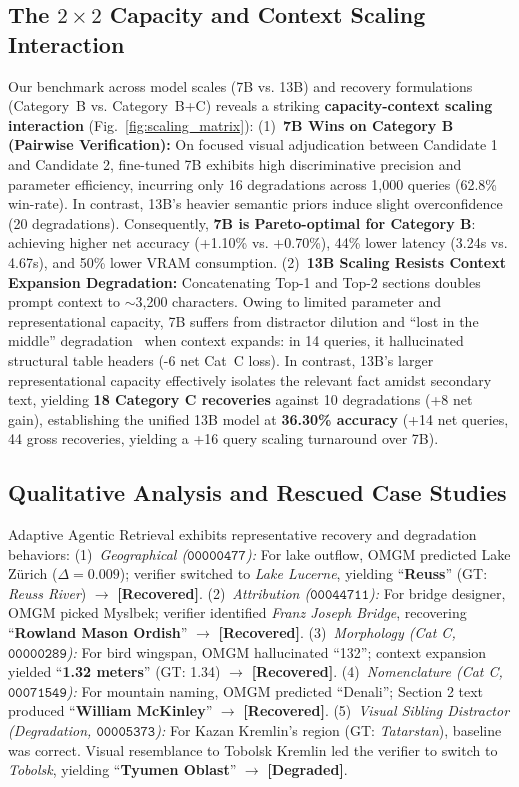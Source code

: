 \documentclass[conference]{IEEEtran}
\begin{document}
\subsection{The \texorpdfstring{$2 \times 2$}{2x2} Capacity and Context Scaling Interaction}
Our benchmark across model scales (7B vs. 13B) and recovery formulations (Category~B vs. Category~B+C) reveals a striking \textbf{capacity-context scaling interaction} (Fig.~\ref{fig:scaling_matrix}):
(1)~\textbf{7B Wins on Category B (Pairwise Verification):} On focused visual adjudication between Candidate 1 and Candidate 2, fine-tuned 7B exhibits high discriminative precision and parameter efficiency, incurring only 16 degradations across 1,000 queries (62.8\% win-rate). In contrast, 13B's heavier semantic priors induce slight overconfidence (20 degradations). Consequently, \textbf{7B is Pareto-optimal for Category B}: achieving higher net accuracy (+1.10\% vs. +0.70\%), 44\% lower latency (3.24s vs. 4.67s), and 50\% lower VRAM consumption.
(2)~\textbf{13B Scaling Resists Context Expansion Degradation:} Concatenating Top-1 and Top-2 sections doubles prompt context to $\sim$3,200 characters. Owing to limited parameter and representational capacity, 7B suffers from distractor dilution and ``lost in the middle'' degradation~\cite{liu2024lost} when context expands: in 14 queries, it hallucinated structural table headers (-6 net Cat~C loss). In contrast, 13B's larger representational capacity effectively isolates the relevant fact amidst secondary text, yielding \textbf{18 Category C recoveries} against 10 degradations (+8 net gain), establishing the unified 13B model at \textbf{36.30\% accuracy} (+14 net queries, 44 gross recoveries, yielding a +16 query scaling turnaround over 7B).

\subsection{Qualitative Analysis and Rescued Case Studies}
Adaptive Agentic Retrieval exhibits representative recovery and degradation behaviors:
(1)~\textit{Geographical ($\mathtt{00000477}$):} For lake outflow, OMGM predicted Lake Z{\"u}rich ($\Delta = 0.009$); verifier switched to \textit{Lake Lucerne}, yielding ``\textbf{Reuss}'' (GT: \textit{Reuss River}) $\to$ \textbf{[Recovered]}.
(2)~\textit{Attribution ($\mathtt{00044711}$):} For bridge designer, OMGM picked Myslbek; verifier identified \textit{Franz Joseph Bridge}, recovering ``\textbf{Rowland Mason Ordish}'' $\to$ \textbf{[Recovered]}.
(3)~\textit{Morphology (Cat C, $\mathtt{00000289}$):} For bird wingspan, OMGM hallucinated ``132''; context expansion yielded ``\textbf{1.32 meters}'' (GT: 1.34) $\to$ \textbf{[Recovered]}.
(4)~\textit{Nomenclature (Cat C, $\mathtt{00071549}$):} For mountain naming, OMGM predicted ``Denali''; Section 2 text produced ``\textbf{William McKinley}'' $\to$ \textbf{[Recovered]}.
(5)~\textit{Visual Sibling Distractor (Degradation, $\mathtt{00005373}$):} For Kazan Kremlin's region (GT: \textit{Tatarstan}), baseline was correct. Visual resemblance to Tobolsk Kremlin led the verifier to switch to \textit{Tobolsk}, yielding ``\textbf{Tyumen Oblast}'' $\to$ \textbf{[Degraded]}.
\end{document}
